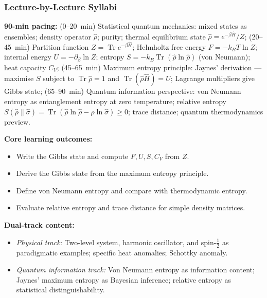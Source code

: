 \documentclass[11pt,a4paper]{article}
\begin{document}
\subsubsection*{Lecture-by-Lecture Syllabi}

\begin{tcolorbox}[modulebox, title={Module~II.7 / L01: Density Operators in Thermodynamics}]
\textbf{90-min pacing:} (0--20~min) Statistical quantum mechanics: mixed states as ensembles; density operator $\hat\rho$; purity; thermal equilibrium state $\hat\rho=e^{-\beta\hat{H}}/Z$; (20--45~min) Partition function $Z=\operatorname{Tr}e^{-\beta\hat{H}}$; Helmholtz free energy $F=-k_BT\ln Z$; internal energy $U=-\partial_\beta\ln Z$; entropy $S=-k_B\operatorname{Tr}(\hat\rho\ln\hat\rho)$ (von Neumann); heat capacity $C_V$; (45--65~min) Maximum entropy principle: Jaynes' derivation --- maximise $S$ subject to $\operatorname{Tr}\hat\rho=1$ and $\operatorname{Tr}(\hat\rho\hat{H})=U$; Lagrange multipliers give Gibbs state; (65--90~min) Quantum information perspective: von Neumann entropy as entanglement entropy at zero temperature; relative entropy $S(\hat\rho\|\hat\sigma)=\operatorname{Tr}(\hat\rho\ln\hat\rho-\hat\rho\ln\hat\sigma)\geq 0$; trace distance; quantum thermodynamics preview.

\medskip\textbf{Core learning outcomes:}
\begin{itemize}[leftmargin=1.4em,topsep=2pt,itemsep=1pt]
  \item Write the Gibbs state and compute $F,U,S,C_V$ from $Z$.
  \item Derive the Gibbs state from the maximum entropy principle.
  \item Define von Neumann entropy and compare with thermodynamic entropy.
  \item Evaluate relative entropy and trace distance for simple density matrices.
\end{itemize}

\medskip\textbf{Dual-track content:}
\begin{itemize}[leftmargin=1.4em,topsep=2pt,itemsep=1pt]
  \item \textit{Physical track:} Two-level system, harmonic oscillator, and spin-$\tfrac{1}{2}$ as paradigmatic examples; specific heat anomalies; Schottky anomaly.
  \item \textit{Quantum information track:} Von Neumann entropy as information content; Jaynes' maximum entropy as Bayesian inference; relative entropy as statistical distinguishability.
\end{itemize}


\end{tcolorbox}
\end{document}
